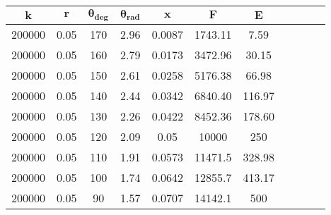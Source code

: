 \begin{tabular}{| c | c | c | c | c | c | c | c | c | c | c |}
	\hline
	$\mathbf{k}$       & $\mathbf{r}$     & $\mathbf{\theta_{deg}}$ & $\mathbf{\theta_{rad}}$ & $\mathbf{x}$       & $\mathbf{F}$       & $\mathbf{E}$       \\ \hline %
	200000  & 0.05  & 170            & 2.96           & 0.0087  & 1743.11 & 7.59    \\ \hline %
	200000  & 0.05  & 160            & 2.79           & 0.0173  & 3472.96 & 30.15   \\ \hline %
	200000  & 0.05  & 150            & 2.61           & 0.0258  & 5176.38 & 66.98   \\ \hline %
	200000  & 0.05  & 140            & 2.44           & 0.0342  & 6840.40 & 116.97  \\ \hline %
	200000  & 0.05  & 130            & 2.26           & 0.0422  & 8452.36 & 178.60  \\ \hline %
	200000  & 0.05  & 120            & 2.09           & 0.05    & 10000   & 250     \\ \hline %
	200000  & 0.05  & 110            & 1.91           & 0.0573  & 11471.5 & 328.98  \\ \hline %
	200000  & 0.05  & 100            & 1.74           & 0.0642  & 12855.7 & 413.17  \\ \hline %
	200000  & 0.05  & 90             & 1.57           & 0.0707  & 14142.1 & 500     \\ \hline %

\end{tabular}
